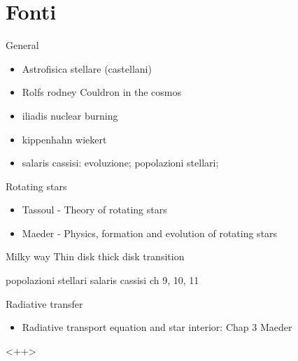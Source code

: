 \section{Fonti}



\begin{frame}{General}
\begin{itemize}
\item Astrofisica stellare (castellani)
\item Rolfs rodney Couldron in the cosmos
\item iliadis nuclear burning
\item kippenhahn wiekert
\item salaris cassisi: evoluzione; popolazioni stellari;
\end{itemize}
\end{frame}

\begin{frame}{Rotating stars}
\begin{itemize}
\item Tassoul - Theory of rotating stars
\item Maeder - Physics, formation and evolution of rotating stars
\end{itemize}
\end{frame}

\begin{frame}{Milky way}
Thin disk thick disk transition
\end{frame}

\begin{frame}{popolazioni stellari}
salaris cassisi ch 9, 10, 11
\end{frame}

\begin{frame}{Radiative transfer}
    \begin{itemize}
        \item Radiative transport equation and star interior: Chap 3 Maeder
    \end{itemize}<++>
\end{frame}
